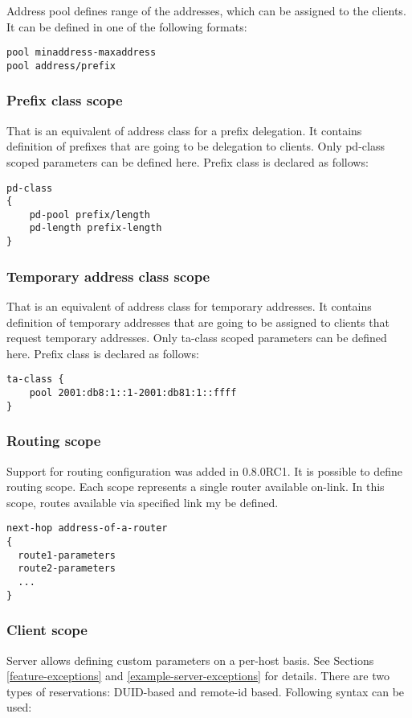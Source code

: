 Address pool defines range of the addresses, which can be assigned to the
clients. It can be defined in one of the following formats:
\begin{lstlisting}
pool minaddress-maxaddress
pool address/prefix
\end{lstlisting}

\subsubsection{Prefix class scope}
\label{server-pd-class-scope}
That is an equivalent of address class for a prefix delegation. It
contains definition of prefixes that are going to be delegation to
clients. Only pd-class scoped parameters can be defined here. Prefix
class is declared as follows:
\begin{lstlisting}
pd-class
{
    pd-pool prefix/length
    pd-length prefix-length
}
\end{lstlisting}

\subsubsection{Temporary address class scope}
\label{server-ta-class-scope}
That is an equivalent of address class for temporary addresses. It
contains definition of temporary addresses that are going to be
assigned to clients that request temporary addresses. Only ta-class
scoped parameters can be defined here. Prefix class is declared as
follows: 
\begin{lstlisting}
ta-class {
    pool 2001:db8:1::1-2001:db81:1::ffff
}
\end{lstlisting}

\subsubsection{Routing scope}
\label{server-route-scope}
Support for routing configuration was added in 0.8.0RC1. It is
possible to define routing scope. Each scope represents a single
router available on-link. In this scope, routes available via
specified link my be defined.

\begin{lstlisting}
next-hop address-of-a-router
{
  route1-parameters
  route2-parameters
  ...
}
\end{lstlisting}

\subsubsection{Client scope}
\label{server-scope-client}
Server allows defining custom parameters on a per-host basis. See
Sections \ref{feature-exceptions} and \ref{example-server-exceptions} 
for details. There are two types of reservations: DUID-based and 
remote-id based. Following syntax can be used:

